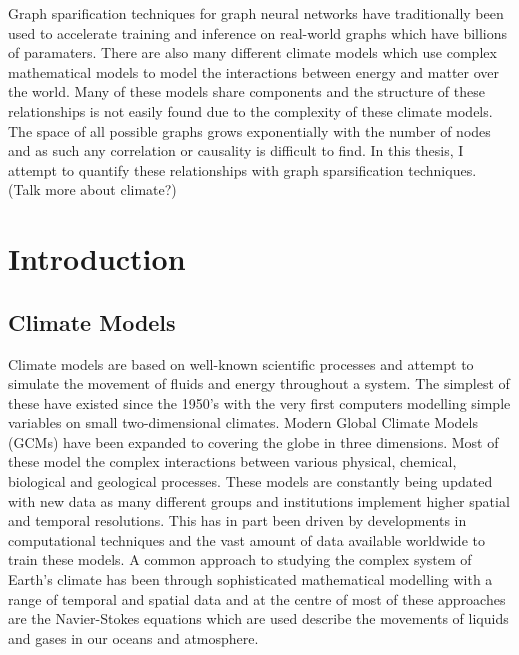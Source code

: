 \documentclass[honours,12pt]{unswthesis}
\newcommand\blankpage{%
    \null
    \thispagestyle{empty}%
    \addtocounter{page}{-1}%
    \newpage}
\numberwithin{equation}{section}
\begin{document}

\afterpage{\blankpage}



Graph sparification techniques for graph neural networks have traditionally been used to 
accelerate training and inference on real-world graphs which have billions of paramaters.
There are also many different climate models which use complex mathematical models to model 
the interactions between energy and matter over the world. Many of these models share 
components and the structure of these relationships is not easily found due to the complexity of
these climate models. The space of all possible graphs grows exponentially with the number 
of nodes and as such any correlation or causality is difficult to find. In this thesis, I attempt 
to quantify these relationships with graph sparsification techniques.
(Talk more about climate?)
\afterpage{\blankpage}


\afterpreface

%
%
\listoffigures
\listoftables

\afterpage{\blankpage}

\chapter{Introduction}\label{s-intro}

{\section{Climate Models}}\label{climate-introduction}

{\noindent}Climate models are based on well-known scientific processes and attempt to simulate the movement of fluids and energy throughout a system. 
The simplest of these have existed since the 1950's with the very first computers modelling simple variables on small two-dimensional climates\cite{edwards2011history}.
Modern Global Climate Models (GCMs) have been expanded to covering the globe in three dimensions. Most of these model the complex interactions between various physical, chemical, biological and geological processes. 
These models are constantly being updated with new data as many different groups and institutions implement higher spatial and temporal resolutions.
This has in part been driven by developments in computational techniques and the vast amount of data available worldwide to train these models.\cite{Overpeck2011}
A common approach to studying the complex system of Earth's climate has been through sophisticated mathematical modelling with a range of temporal and spatial data\cite{Kulinich_2022}
and at the centre of most of these approaches are the Navier-Stokes equations which are used describe the movements of liquids and gases in our oceans and atmosphere.\cite{Palmer2008} \\
\end{document}
